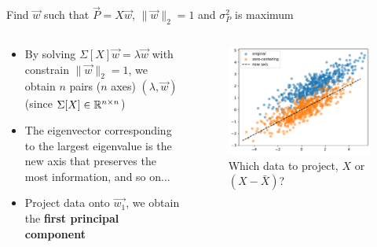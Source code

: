 \begin{frame}{Find $\vec{w}$ such that $\vec{P} = X\vec{w}$, $\|\vec{w}\|_2=1$ and $\sigma^2_{P}$ is maximum}
    \begin{columns}
        \begin{column}{0.6\textwidth}
            \begin{itemize}
                \item By solving $\Sigma[X]\vec{w} = \lambda\vec{w}$ with constrain $\|\vec{w}\|_2=1$, we obtain $n$ pairs ($n$ axes) $(\lambda, \vec{w})$ (since $\Sigma[X]\in \mathbb{R}^{n\times n}$)
                \item The eigenvector corresponding to the largest eigenvalue is the new axis that preserves the most information, and so on...
                \item Project data onto $\vec{w_1}$, we obtain the \textbf{first principal component}
            \end{itemize}
        \end{column}

        \begin{column}{0.4\textwidth}
            \begin{figure}
                \centering
                \includegraphics[width=\linewidth]{img/dp2.pdf}
                \caption{Which data to project, $X$ or $(X-\bar{X})$?}
            \end{figure}
        \end{column}
    \end{columns}
\end{frame}

